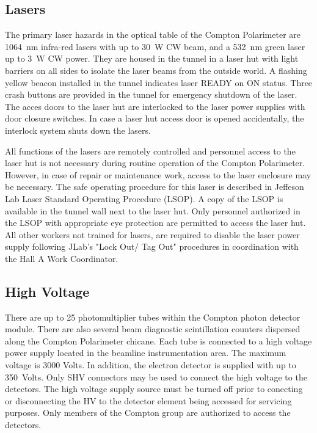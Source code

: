 \begin{safetyen}{10}{15}
\subsection{Lasers}
The primary laser hazards in the optical table of the Compton Polarimeter are 1064~nm infra-red lasers with up to 30~W CW beam, and a  532~nm green laser up to 3~W CW power.
They are housed in the tunnel in a laser hut with light barriers  on all sides to isolate the laser beams  from the  outside world. A flashing yellow beacon installed in the tunnel indicates laser READY on ON status. Three crash buttons are provided in the tunnel for emergency shutdown of the laser. The acces doors to the laser hut are interlocked to the laser power supplies with  door closure switches. In case a laser hut access door is opened accidentally, the interlock system shuts down the lasers. 

All functions of the lasers are remotely controlled and personnel access to the laser hut
is not necessary during routine operation of the Compton Polarimeter. However, in case of repair  
or maintenance work, access to the laser enclosure may be necessary. The safe operating procedure for this laser is described in 
Jeffeson Lab Laser Standard Operating Procedure \cite{compton_LSOP} (LSOP). A copy of the LSOP is available in the tunnel wall next to the laser hut. Only personnel authorized in the LSOP with appropriate eye protection are permitted to access the laser hut. All other workers not trained for lasers, are required to disable the laser power supply following JLab's "Lock Out/ Tag Out" procedures in coordination with the Hall A Work Coordinator.
 
\subsection{High Voltage}

There are up to 25 photomultiplier tubes within the Compton photon detector module. There are also several beam diagnostic scintillation counters dispersed along the Compton Polarimeter chicane.
Each tube is connected to a high voltage power supply located in the beamline instrumentation area. The maximum voltage is 3000 Volts. 
In addition, the electron detector is supplied with up to 350~Volts. Only SHV connectors may be used to connect the high voltage to the detectors. 
The high voltage supply source must be turned off prior to conecting or disconnecting the HV to the  detector element being accessed
for servicing purposes. Only members of the Compton group
are authorized to access the  detectors.\\

\end{safetyen}

